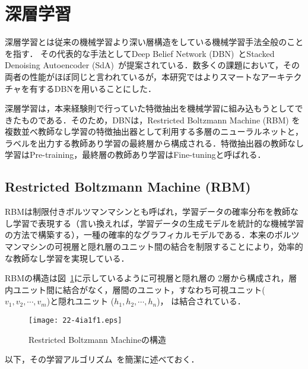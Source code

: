 \documentclass[japanese]{jnlp_1.4}
\begin{document}
\section{深層学習}

深層学習とは従来の機械学習より深い層構造をしている機械学習手法全般のことを指す．
その代表的な手法としてDeep Belief Network (DBN)~\cite{Hinton,Lee,Bengio:09,Bengio:13}とStacked Denoising Autoencoder (SdA)~\cite{Bengio:07,Bengio:09,Bengio:13,Vincent:08,Vincent:10}が提案されている．数多くの課題において，その両者の性能がほぼ同じと言われているが，本研究ではよりスマートなアーキテクチャを有するDBNを用いることにした．

深層学習は，本来経験則で行っていた特徴抽出を機械学習に組み込もうとしてできたものである．そのため，DBNは，Restricted Boltzmann Machine (RBM) を複数並べ教師なし学習の特徴抽出器として利用する多層のニューラルネットと，ラベルを出力する教師あり学習の最終層から構成される．特徴抽出器の教師なし学習はPre-training，最終層の教師あり学習はFine-tuningと呼ばれる．


\subsection{Restricted Boltzmann Machine (RBM)}

RBMは制限付きボルツマンマシンとも呼ばれ，学習データの確率分布を教師なし学習で表現する（言い換えれば，学習データの生成モデルを統計的な機械学習の方法で構築する），一種の確率的なグラフィカルモデルである．本来のボルツマンマシンの可視層と隠れ層のユニット間の結合を制限することにより，効率的な教師なし学習を実現している．

RBMの構造は図~\ref{fig_rbm}に示しているように可視層と隠れ層の  2層から構成され，層内ユニット間に結合がなく，層間のユニット，すなわち可視ユニット($v_1, v_2, \cdots, v_m$)と隠れユニット ($h_1, h_2, \cdots, h_n$)， は結合されている． 

\begin{figure}[t]
\begin{center}
\texttt{[image: 22-4ia1f1.eps]}
\end{center}
\caption{Restricted Boltzmann Machineの構造}
\label{fig_rbm}
\vspace{-1\Cvs}
\end{figure}

以下，その学習アルゴリズム~\cite{Bengio:09}を簡潔に述べておく．
\end{document}
